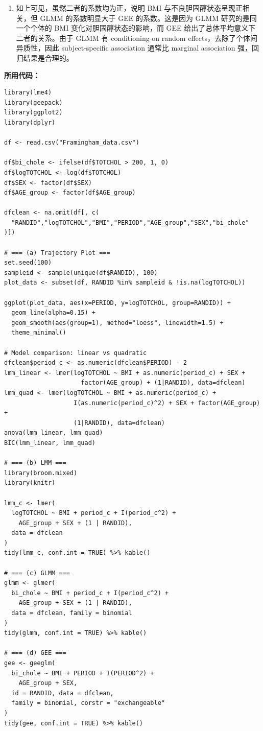 \begin{enumerate}[label=(\alph*)]
在 GEE 中，总体平均意义下，BMI 每增加一个单位，undesirable cholesterol 的 odds 平均增加约 0.0808 倍。

\item 如上可见，虽然二者的系数均为正，说明 BMI 与不良胆固醇状态呈现正相关，但 GLMM 的系数明显大于 GEE 的系数。这是因为 GLMM 研究的是同一个个体的 BMI 变化对胆固醇状态的影响，而 GEE 给出了总体平均意义下二者的关系。由于 GLMM 有 conditioning on random effects，去除了个体间异质性，因此 subject-specific association 通常比 marginal association 强，回归结果是合理的。
\end{enumerate}

\bigskip
\textbf{所用代码：}

\begin{lstlisting}
library(lme4)
library(geepack)
library(ggplot2)
library(dplyr)

df <- read.csv("Framingham_data.csv")

df$bi_chole <- ifelse(df$TOTCHOL > 200, 1, 0)
df$logTOTCHOL <- log(df$TOTCHOL)
df$SEX <- factor(df$SEX)
df$AGE_group <- factor(df$AGE_group)

dfclean <- na.omit(df[, c(
  "RANDID","logTOTCHOL","BMI","PERIOD","AGE_group","SEX","bi_chole"
)])

# === (a) Trajectory Plot ===
set.seed(100)
sampleid <- sample(unique(df$RANDID), 100)
plot_data <- subset(df, RANDID %in% sampleid & !is.na(logTOTCHOL))

ggplot(plot_data, aes(x=PERIOD, y=logTOTCHOL, group=RANDID)) +
  geom_line(alpha=0.15) +
  geom_smooth(aes(group=1), method="loess", linewidth=1.5) +
  theme_minimal()

# Model comparison: linear vs quadratic
dfclean$period_c <- as.numeric(dfclean$PERIOD) - 2
lmm_linear <- lmer(logTOTCHOL ~ BMI + as.numeric(period_c) + SEX +
                     factor(AGE_group) + (1|RANDID), data=dfclean)
lmm_quad <- lmer(logTOTCHOL ~ BMI + as.numeric(period_c) +
                   I(as.numeric(period_c)^2) + SEX + factor(AGE_group) +
                   (1|RANDID), data=dfclean)
anova(lmm_linear, lmm_quad)
BIC(lmm_linear, lmm_quad)

# === (b) LMM ===
library(broom.mixed)
library(knitr)

lmm_c <- lmer(
  logTOTCHOL ~ BMI + period_c + I(period_c^2) +
    AGE_group + SEX + (1 | RANDID),
  data = dfclean
)
tidy(lmm_c, conf.int = TRUE) %>% kable()

# === (c) GLMM ===
glmm <- glmer(
  bi_chole ~ BMI + period_c + I(period_c^2) +
    AGE_group + SEX + (1 | RANDID),
  data = dfclean, family = binomial
)
tidy(glmm, conf.int = TRUE) %>% kable()

# === (d) GEE ===
gee <- geeglm(
  bi_chole ~ BMI + PERIOD + I(PERIOD^2) +
    AGE_group + SEX,
  id = RANDID, data = dfclean,
  family = binomial, corstr = "exchangeable"
)
tidy(gee, conf.int = TRUE) %>% kable()
\end{lstlisting}